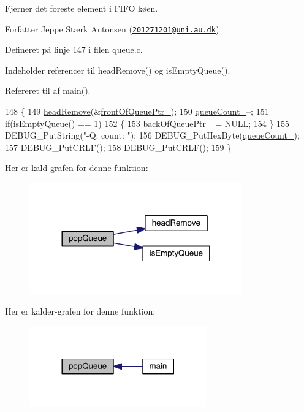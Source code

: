 Fjerner det foreste element i F\+I\+FO køen.

\begin{DoxyAuthor}{Forfatter}
Jeppe Stærk Antonsen (\href{mailto:201271201@uni.au.dk}{\tt 201271201@uni.\+au.\+dk}) 
\end{DoxyAuthor}


Defineret på linje 147 i filen queue.\+c.



Indeholder referencer til head\+Remove() og is\+Empty\+Queue().



Refereret til af main().


\begin{DoxyCode}
148 \{
149   \hyperlink{class_queue_ae54666c891fd21d5497f48c385a00b74}{headRemove}(&\hyperlink{class_queue_aa48f05218d0a78402821c8aa9bdad06a}{frontOfQueuePtr\_});
150   \hyperlink{class_queue_ad260f9ccca00e80d161bbf3e70c3ffa6}{queueCount\_}--;
151   \textcolor{keywordflow}{if}(\hyperlink{class_queue_aafb324c79731abdc228dbf94d86722a3}{isEmptyQueue}() == 1)
152   \{
153     \hyperlink{class_queue_a225d2c9ad4e83d6da443e99b8869a51c}{backOfQueuePtr\_} = NULL;
154   \}
155   DEBUG\_PutString(\textcolor{stringliteral}{"-Q: count: "});
156   DEBUG\_PutHexByte(\hyperlink{class_queue_ad260f9ccca00e80d161bbf3e70c3ffa6}{queueCount\_});
157   DEBUG\_PutCRLF();
158   DEBUG\_PutCRLF();
159 \}
\end{DoxyCode}


Her er kald-\/grafen for denne funktion\+:
\nopagebreak
\begin{figure}[H]
\begin{center}
\leavevmode
\includegraphics[width=260pt]{d4/da4/class_queue_a9ecab9ecdedfc331aed9a0ae63ce193b_cgraph}
\end{center}
\end{figure}




Her er kalder-\/grafen for denne funktion\+:
\nopagebreak
\begin{figure}[H]
\begin{center}
\leavevmode
\includegraphics[width=216pt]{d4/da4/class_queue_a9ecab9ecdedfc331aed9a0ae63ce193b_icgraph}
\end{center}
\end{figure}



